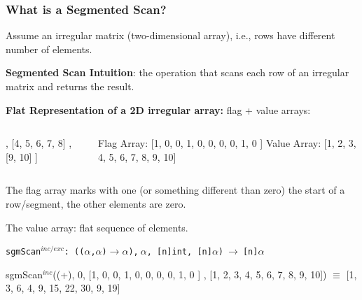 \documentclass{beamer}
\renewcommand{\emph}[1]{\textcolor{CosGreen}{ #1}}
\newcommand{\emp}[1]{\textcolor{DikuRed}{ #1}}
\newcommand{\mymath}[1]{$ #1 $}
\newcommand{\myindu}[1]{^{#1}}
\begin{document}
\begin{frame}[fragile,t]
  \frametitle{What is a Segmented Scan?}

\pause
Assume an \emp{irregular} matrix (two-dimensional array), 
i.e., rows have different number of elements.\medskip

{\bf Segmented Scan Intuition}: the operation that scans each
row of an irregular matrix and returns the result.\medskip

{\bf Flat Representation of a 2D irregular array:} flag + value arrays:
\pause
\begin{columns}
\begin{colorcode}
[ [1, 2, 3]
, [4, 5, 6, 7, 8]
, [9, 10]
]
\end{colorcode}
\begin{colorcode}
Flag Array:
[1, 0, 0, 1, 0, 0, 0, 0, 1, 0 ]
Value Array:
[1, 2, 3, 4, 5, 6, 7, 8, 9, 10]
\end{colorcode}
\end{columns}\medskip

\emp{The flag array} marks with one (or something different than zero) 
the start of a row/segment, the other elements are zero.\medskip

\emp{The value array}: flat sequence of elements. \bigskip

\begin{scriptsize}
\emp{{\tt sgmScan$^{inc/exc}$:~(($\alpha$,$\alpha$)$\rightarrow\alpha$),$~\alpha$,~[n]int,~[n]$\alpha$)$~\rightarrow~$[n]$\alpha$}}\\
\begin{colorcode}
\emp{sgmScan\mymath{\myindu{inc}}((+), 0, [1, 0, 0, 1, 0, 0,  0,  0,  1, 0 ]}
               \emp{ , [1, 2, 3, 4, 5, 6,  7,  8,  9, 10])} \mymath{\equiv}\pause
               \emph{   [1, 3, 6, 4, 9, 15, 22, 30, 9, 19]}
\end{colorcode}
\end{scriptsize}
\end{frame}
\end{document}
